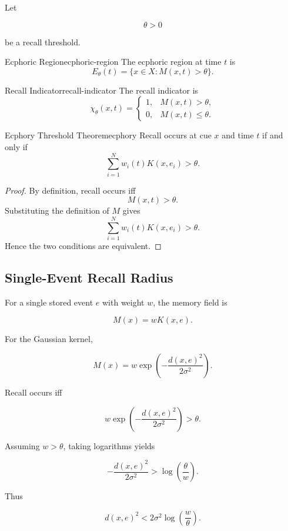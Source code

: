 \documentclass[12pt,twoside,openright]{book}
\begin{document}
Let

\[
\theta>0
\]

be a recall threshold.

\begin{definition}{Ecphoric Region}{ecphoric-region}
  The ecphoric region at time \(t\) is
  \[
    E_\theta(t)
=
    \{x\in X:M(x,t)>\theta\}.
  \]
\end{definition}

\begin{definition}{Recall Indicator}{recall-indicator}
  The recall indicator is
  \[
    \chi_\theta(x,t)
=
    \begin{cases}
      1, & M(x,t)>\theta,\\
      0, & M(x,t)\le\theta.
    \end{cases}
  \]
\end{definition}

\begin{theorem}{Ecphory Threshold Theorem}{ecphory}
  Recall occurs at cue \(x\) and time \(t\) if and only if
  \[
    \sum_{i=1}^{N} w_i(t)K(x,e_i)>\theta.
  \]
\end{theorem}

\begin{proof}
  By definition, recall occurs iff
  \[
    M(x,t)>\theta.
  \]
  Substituting the definition of \(M\) gives
  \[
    \sum_{i=1}^{N} w_i(t)K(x,e_i)>\theta.
  \]
  Hence the two conditions are equivalent.
\end{proof}

\subsection{Single-Event Recall Radius}

For a single stored event \(e\) with weight \(w\), the
memory field is

\[
M(x)
=
wK(x,e).
\]

For the Gaussian kernel,

\[
M(x)
=
w
\exp
\left(
-\frac{d(x,e)^2}{2\sigma^2}
\right).
\]

Recall occurs iff

\[
w
\exp
\left(
-\frac{d(x,e)^2}{2\sigma^2}
\right)
>
\theta.
\]

Assuming \(w>\theta\), taking logarithms yields

\[
-\frac{d(x,e)^2}{2\sigma^2}
>
\log\left(\frac{\theta}{w}\right).
\]

Thus

\[
d(x,e)^2
<
2\sigma^2
\log\left(\frac{w}{\theta}\right).
\]
\end{document}
